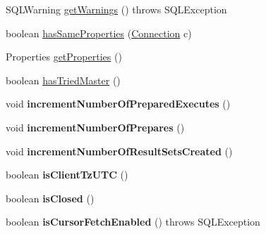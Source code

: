 \begin{DoxyCompactItemize}
\item 
S\+Q\+L\+Warning \mbox{\hyperlink{classcom_1_1mysql_1_1jdbc_1_1_connection_impl_a2a2656c2cc08e004580f53ff19340bf1}{get\+Warnings}} ()  throws S\+Q\+L\+Exception 
\item 
boolean \mbox{\hyperlink{classcom_1_1mysql_1_1jdbc_1_1_connection_impl_aa1d8937ef315e396f9acfbeea1ff8c8f}{has\+Same\+Properties}} (\mbox{\hyperlink{interfacecom_1_1mysql_1_1jdbc_1_1_connection}{Connection}} c)
\item 
Properties \mbox{\hyperlink{classcom_1_1mysql_1_1jdbc_1_1_connection_impl_a12d59167c09571dff544e96ff65b302b}{get\+Properties}} ()
\item 
boolean \mbox{\hyperlink{classcom_1_1mysql_1_1jdbc_1_1_connection_impl_a0ec4ef24675c2376faaa45c842031f69}{has\+Tried\+Master}} ()
\item 
\mbox{\label{classcom_1_1mysql_1_1jdbc_1_1_connection_impl_a8ddfb180857c1abddcea0cde101ff565}} 
void {\bfseries increment\+Number\+Of\+Prepared\+Executes} ()
\item 
\mbox{\label{classcom_1_1mysql_1_1jdbc_1_1_connection_impl_a66f2da545607b6a2c264695daae64bd6}} 
void {\bfseries increment\+Number\+Of\+Prepares} ()
\item 
\mbox{\label{classcom_1_1mysql_1_1jdbc_1_1_connection_impl_a8cc8bc97640cd5b0b80c8144c918e458}} 
void {\bfseries increment\+Number\+Of\+Result\+Sets\+Created} ()
\item 
\mbox{\label{classcom_1_1mysql_1_1jdbc_1_1_connection_impl_a1752e9923858138e954947bda73b4acd}} 
boolean {\bfseries is\+Client\+Tz\+U\+TC} ()
\item 
\mbox{\label{classcom_1_1mysql_1_1jdbc_1_1_connection_impl_a5f6b9371e9074fd9b295e37e361053f0}} 
boolean {\bfseries is\+Closed} ()
\item 
\mbox{\label{classcom_1_1mysql_1_1jdbc_1_1_connection_impl_a5fdeaf3735e32f0bebba052e9e0468f8}} 
boolean {\bfseries is\+Cursor\+Fetch\+Enabled} ()  throws S\+Q\+L\+Exception 
\item 

\end{DoxyCompactItemize}
